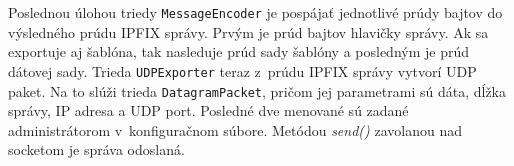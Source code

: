 Poslednou úlohou triedy \verb|MessageEncoder| je pospájať jednotlivé prúdy bajtov do výsledného prúdu IPFIX 
správy. Prvým je prúd bajtov hlavičky správy. Ak sa exportuje aj šablóna, tak nasleduje prúd sady šablóny 
a posledným je prúd dátovej sady. Trieda \verb|UDPExporter| teraz z~prúdu IPFIX správy vytvorí 
UDP paket. Na to slúži trieda \verb|DatagramPacket|, pričom jej parametrami sú dáta, dĺžka správy, 
IP adresa a UDP port. Posledné dve menované sú zadané administrátorom v~konfiguračnom súbore. Metódou 
\emph{send()} zavolanou nad socketom je správa odoslaná.







